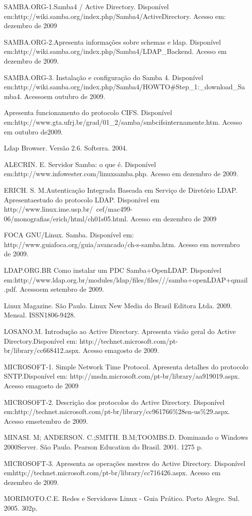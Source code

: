 SAMBA.ORG-1.Samba4 / Active Directory. Disponível em:http://wiki.samba.org/index.php/Samba4/ActiveDirectory. Acesso em: dezembro de 2009

SAMBA.ORG-2.Apresenta informações sobre schemas e ldap. Disponível em:http://wiki.samba.org/index.php/Samba4/LDAP\_Backend. Acesso em dezembro de 2009.

SAMBA.ORG-3. Instalação e configuração do Samba 4. Disponível em:http://wiki.samba.org/index.php/Samba4/HOWTO\#Step\_1:\_download\_Samba4. Acessoem outubro de 
2009.

Apresenta funcionamento do protocolo CIFS. Disponível em:http://www.gta.ufrj.br/grad/01\_2/samba/smbcifsinternamente.htm. Acesso em outubro de2009.

Ldap Browser. Versão 2.6. Softerra. 2004.

ALECRIN. E. Servidor Samba: o que é. Disponível em:http://www.infowester.com/linuxsamba.php. Acesso em dezembro de 2009.


ERICH. S. M.Autenticação Integrada Baseada em Serviço de Diretório LDAP. Apresentaestudo do protocolo LDAP. Disponível em http://www.linux.ime.usp.br/~cef/mac499-06/monografias/erich/html/ch01s05.html. Acesso em dezembro de 2009


FOCA GNU/Linux. Samba. Disponível em: http://www.guiafoca.org/guia/avancado/ch-s-samba.htm. Acesso em novembro de 2009.

LDAP.ORG.BR Como instalar um PDC Samba+OpenLDAP. Disponível em:http://www.ldap.org.br/modules/ldap/files/files///samba+openLDAP+qmail.pdf. Acessoem setembro de 2009.

Linux Magazine. São Paulo. Linux New Media do Brasil Editora Ltda. 2009. Mensal. ISSN1806-9428.

LOSANO.M. Introdução ao Active Directory. Apresenta visão geral do Active Directory.Disponível em: http://technet.microsoft.com/pt-br/library/cc668412.aspx. Acesso emagosto de 2009.

MICROSOFT-1. Simple Network Time Protocol. Apresenta detalhes do protocolo SNTP.Disponível em: http://msdn.microsoft.com/pt-br/library/aa919019.aspx. Acesso emagosto de 2009

MICROSOFT-2. Descrição dos protocolos do Active Directory. Disponível em:http://technet.microsoft.com/pt-br/library/cc961766\%28en-us\%29.aspx. Acesso emsetembro de 2009.

MINASI. M; ANDERSON. C.;SMITH. B.M;TOOMBS.D. Dominando o Windows 2000Server. São Paulo. Pearson Education do Brasil. 2001. 1275 p.

MICROSOFT-3. Apresenta as operações mestres do Active Directory. Disponível emhttp://technet.microsoft.com/pt-br/library/cc716426.aspx. Acesso em dezembro de 2009.

MORIMOTO.C.E. Redes e Servidores Linux - Guia Prático. Porto Alegre. Sul. 2005. 302p.